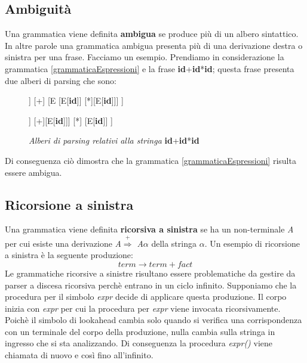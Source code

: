 \subsection{Ambiguità}
Una grammatica viene definita \textbf{ambigua} se produce più di un albero sintattico. In altre parole una grammatica ambigua presenta \cite{libro: compilatori} più di una derivazione destra o sinistra per una frase. Facciamo un esempio. Prendiamo in considerazione la grammatica \ref{grammaticaEspressioni} e la frase \textbf{id}+\textbf{id}*\textbf{id}; questa frase presenta due alberi di parsing che sono:\par
\begin{figure}[hbpb]\label{alberibis}
	\centering
	\begin{forest}
		[E
		[E[\textbf{id}]]
		[+]
		[E
		[E[\textbf{id}]] [*][E[\textbf{id}]]]
		]
	\end{forest}
	\begin{forest}
		[E
		[E [E[\textbf{id}]] [+][E[\textbf{id}]]]
		[*]
		[E[\textbf{id}]]
		]
	\end{forest}
	\caption{\textit{Alberi di parsing relativi alla stringa } \textbf{id}+\textbf{id}*\textbf{id}}
\end{figure}
Di conseguenza ciò dimostra che la grammatica \ref{grammaticaEspressioni} risulta essere ambigua.
\subsection{Ricorsione a sinistra}\label{par:ric}
Una grammatica viene definita \textbf{ricorsiva a sinistra} \cite{libro: compilatori} se ha un non-terminale \textit{A} per cui esiste una derivazione \textit{A}$\overset{+}{\Rightarrow}$ \textit{A}$\alpha$ della stringa $\alpha$. Un esempio di ricorsione a sinistra è la seguente produzione:
\[
	term \to term + fact
\]
Le grammatiche ricorsive a sinistre risultano essere problematiche da gestire da parser a discesa ricorsiva perchè entrano in un ciclo infinito. Supponiamo che la procedura per il simbolo \textit{expr} decide di applicare questa produzione. Il corpo inizia con \textit{expr} per cui la procedura per \textit{expr} viene invocata ricorsivamente. Poichè il simbolo di lookahead cambia solo quando si verifica una corrispondenza con un terminale del corpo della produzione, nulla cambia sulla stringa in ingresso che si sta analizzando. Di conseguenza la procedura \textit{expr()} viene chiamata di nuovo e così fino all'infinito.
